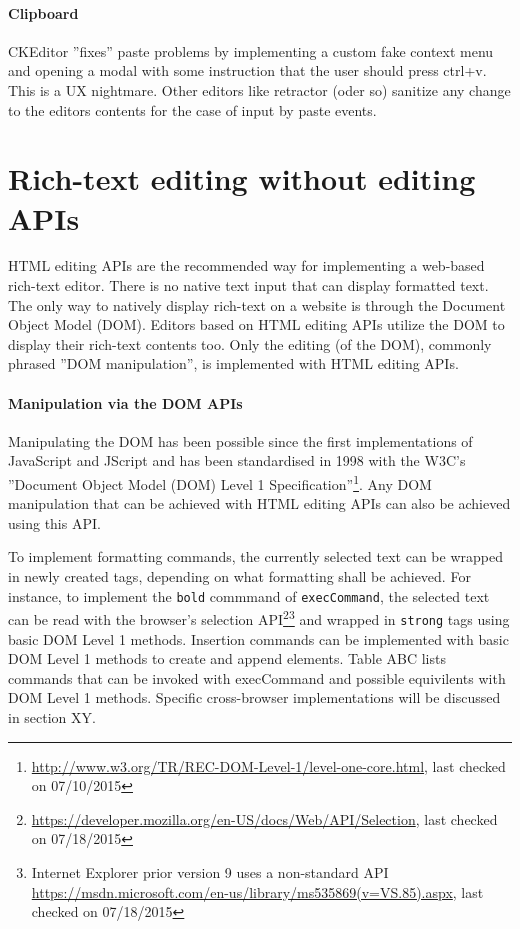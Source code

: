\paragraph{Clipboard} CKEditor ''fixes'' paste problems by implementing a custom fake context menu and opening a modal with some instruction that the user should press ctrl+v. This is a UX nightmare. Other editors like retractor (oder so) sanitize any change to the editors contents for the case of input by paste events.

\section{Rich-text editing without editing APIs}

HTML editing APIs are the recommended way for implementing a web-based rich-text editor. There is no native text input that can display formatted text. The only way to natively display rich-text on a website is through the Document Object Model (DOM). Editors based on HTML editing APIs utilize the DOM to display their rich-text contents too. Only the editing (of the DOM), commonly phrased ''DOM manipulation'', is implemented with HTML editing APIs.

\paragraph{Manipulation via the DOM APIs} Manipulating the DOM has been possible since the first implementations of JavaScript and JScript and has been standardised in 1998 with the W3C's ''Document Object Model (DOM) Level 1 Specification''\footnote{\url{http://www.w3.org/TR/REC-DOM-Level-1/level-one-core.html}, last checked on 07/10/2015}. Any DOM manipulation that can be achieved with HTML editing APIs can also be achieved using this API.


To implement formatting commands, the currently selected text can be wrapped in newly created tags, depending on what formatting shall be achieved. For instance, to implement the \texttt{bold} commmand of \texttt{execCommand}, the selected text can be read with the browser's selection API\footnote{\url{https://developer.mozilla.org/en-US/docs/Web/API/Selection}, last checked on 07/18/2015}\footnote{Internet Explorer prior version 9 uses a non-standard API \url{https://msdn.microsoft.com/en-us/library/ms535869(v=VS.85).aspx}, last checked on 07/18/2015} and wrapped in \texttt{strong} tags using basic DOM Level 1 methods. Insertion commands can be implemented with basic DOM Level 1 methods to create and append elements. Table ABC lists commands that can be invoked with execCommand and possible equivilents with DOM Level 1 methods. Specific cross-browser implementations will be discussed in section XY.


